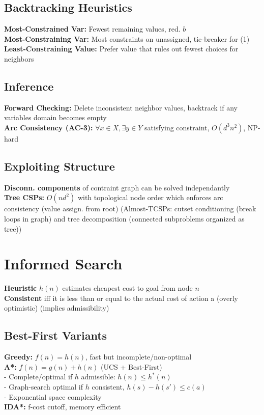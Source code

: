 \documentclass[8pt,landscape,a4paper]{article}
\begin{document}
\begin{multicols*}{3}
\subsection{Backtracking Heuristics}
\textbf{Most-Constrained Var:} Fewest remaining values, red. $b$\\
\textbf{Most-Constraining Var:} Most constraints on unassigned, tie-breaker for (1)\\
\textbf{Least-Constraining Value:} Prefer value that rules out fewest choices for neighbors

\subsection{Inference}
\textbf{Forward Checking:} Delete inconsistent neighbor values, backtrack if any variables domain becomes empty\\
\textbf{Arc Consistency (AC-3):} $\forall x\in X, \exists y\in Y$ satisfying constraint, $O(d^3n^2)$, NP-hard

\subsection{Exploiting Structure}
\textbf{Disconn. components} of contraint graph can be solved independantly\\
\textbf{Tree CSPs:} $O(nd^2)$ with topological node order which enforces arc consistency (value assign. from root) (Almost-TCSPs: cutset conditioning (break loops in graph) and tree decomposition (connected subproblems organized as tree))

\section{Informed Search}
\textbf{Heuristic} $h(n)$ estimates cheapest cost to goal from node $n$\\
\textbf{Consistent} iff it is less than or equal to the actual cost of action a (overly optimistic) (implies admissibility)

\subsection{Best-First Variants}
\textbf{Greedy:} $f(n) = h(n)$, fast but incomplete/non-optimal\\
\textbf{A*:} $f(n) = g(n) + h(n)$ (UCS + Best-First)\\
- Complete/optimal if $h$ admissible: $h(n) \leq h^*(n)$\\
- Graph-search optimal if $h$ consistent, $h(s) - h(s')\leq c(a)$\\
- Exponential space complexity\\
\textbf{IDA*:} f-cost cutoff, memory efficient


\end{multicols*}
\end{document}
